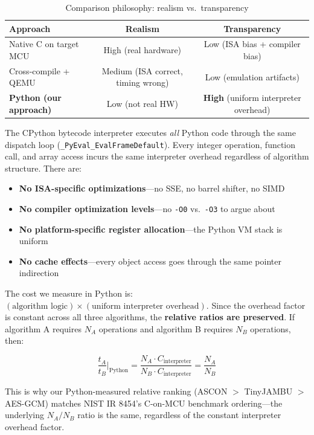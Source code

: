 \documentclass[11pt,a4paper]{article}
\begin{document}
\begin{table}[H]
\centering
\caption{Comparison philosophy: realism vs.\ transparency}
\label{tab:philosophy}
\begin{tabular}{lcc}
\toprule
\textbf{Approach} & \textbf{Realism} & \textbf{Transparency} \\
\midrule
Native C on target MCU & High (real hardware) & Low (ISA bias + compiler bias) \\
Cross-compile + QEMU & Medium (ISA correct, timing wrong) & Low (emulation artifacts) \\
\textbf{Python (our approach)} & Low (not real HW) & \textbf{High} (uniform interpreter overhead) \\
\bottomrule
\end{tabular}
\end{table}

The CPython bytecode interpreter executes \textit{all} Python code through the same dispatch loop ({\tt \_PyEval\_EvalFrameDefault}). Every integer operation, function call, and array access incurs the same interpreter overhead regardless of algorithm structure. There are:

\begin{itemize}
    \item \textbf{No ISA-specific optimizations}---no SSE, no barrel shifter, no SIMD
    \item \textbf{No compiler optimization levels}---no {\tt -O0} vs.\ {\tt -O3} to argue about
    \item \textbf{No platform-specific register allocation}---the Python VM stack is uniform
    \item \textbf{No cache effects}---every object access goes through the same pointer indirection
\end{itemize}

The cost we measure in Python is: \((\text{algorithm logic}) \times (\text{uniform interpreter overhead})\). Since the overhead factor is constant across all three algorithms, the \textbf{relative ratios are preserved}. If algorithm A requires $N_A$ operations and algorithm B requires $N_B$ operations, then:

\[
\frac{t_A}{t_B}\Big|_{\text{Python}} = \frac{N_A \cdot C_{\text{interpreter}}}{N_B \cdot C_{\text{interpreter}}} = \frac{N_A}{N_B}
\]

This is why our Python-measured relative ranking (ASCON $>$ TinyJAMBU $>$ AES-GCM) matches NIST IR 8454's C-on-MCU benchmark ordering---the underlying $N_A/N_B$ ratio is the same, regardless of the constant interpreter overhead factor.
\end{document}
